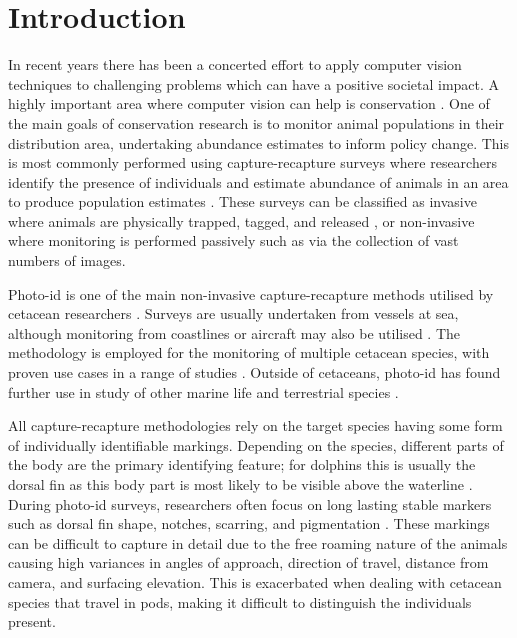 \chapter{Introduction}\label{ch:intro}


In recent years there has been a concerted effort to apply computer vision techniques to challenging problems which can have a positive societal impact. A highly important area where computer vision can help is conservation \cite{weinstein_computer_2018}. One of the main goals of conservation research is to monitor animal populations in their distribution area, undertaking abundance estimates to inform policy change. This is most commonly performed using capture-recapture surveys where researchers identify the presence of individuals and estimate abundance of animals in an area to produce population estimates \cite{constantine_abundance_2012, bigg_assessment_1982, sharpe_indian_2019, van_bressem_visual_2018, arso_civil_changing_2019, cheney_long-term_2014}. These surveys can be classified as invasive where animals are physically trapped, tagged, and released \cite{norris_tagging_1970, hobbs_bowhead_1982, andrews_best_2019}, or non-invasive where monitoring is performed passively such as via the collection of vast numbers of images. 

Photo-id is one of the main non-invasive capture-recapture methods utilised by cetacean researchers \cite{hammond_individual_1990, evans_monitoring_2004}. Surveys are usually undertaken from vessels at sea, although monitoring from coastlines or aircraft may also be utilised \cite{payne_long_1986, forney_seasonal_1998, wursig_methods_1990}. The methodology is employed for the monitoring of multiple cetacean species, with proven use cases in a range of studies \cite{sharpe_indian_2019, miragliuolo_rissos_2004, feyrer_origin_2021, bigg_assessment_1982}. Outside of cetaceans, photo-id has found further use in study of other marine life \cite{holmberg_estimating_2009, reisser_photographic_2008} and terrestrial species \cite{goswami_application_2007, clapham_automated_2020}.

All capture-recapture methodologies rely on the target species having some form of individually identifiable markings. Depending on the species, different parts of the body are the primary identifying feature; for dolphins this is usually the dorsal fin as this body part is most likely to be visible above the waterline \cite{sharpe_indian_2019, baird_population_2009}. During photo-id surveys, researchers often focus on long lasting stable markers such as dorsal fin shape, notches, scarring, and pigmentation \cite{wursig_photographic_1977, lockyer_observations_1990, mann_cetacean_2000}. These markings can be difficult to capture in detail due to the free roaming nature of the animals causing high variances in angles of approach, direction of travel, distance from camera, and surfacing elevation. This is exacerbated when dealing with cetacean species that travel in pods, making it difficult to distinguish the individuals present.

